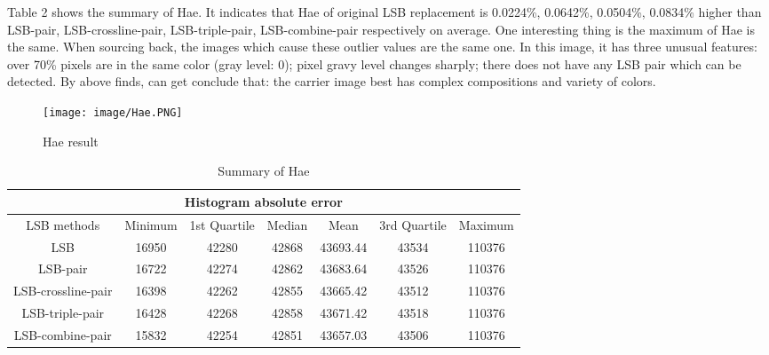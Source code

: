 \documentclass[%
    reprint,
    amsmath,amssymb,
    aps,
   ]{revtex4-1}
\begin{document}
   Table 2 shows the summary of Hae. It indicates that Hae of original LSB replacement is 0.0224\%, 0.0642\%, 0.0504\%, 0.0834\% higher than LSB-pair, LSB-crossline-pair, LSB-triple-pair, LSB-combine-pair respectively on average. One interesting thing is the maximum of Hae is the same. When sourcing back, the images which cause these outlier values are the same one. In this image, it has three unusual features: over 70\% pixels are in the same color (gray level: 0); pixel gravy level changes sharply; there does not have any LSB pair which can be detected. By above finds, can get conclude that: the carrier image best has complex compositions and variety of colors.   
   
   \begin{figure}[h]
   \texttt{[image: image/Hae.PNG]}
   \caption{Hae result}
   \label{fig:figure}
   \end{figure} 
   
   
   \begin{table*}
   \begin{tabular}{ |c|c|c|c|c|c|c|  }
    \hline
    \multicolumn{7}{|c|}{Histogram absolute error} \\
    \hline
    LSB methods    &Minimum&1st Quartile	&Median	&Mean	&3rd Quartile	&Maximum\\
    \hline
    LSB&               16950	&42280	&42868	&43693.44	&43534	&110376\\
    \hline
    LSB-pair	        &16722	&42274	&42862	&43683.64	&43526	&110376\\
    \hline
    LSB-crossline-pair	&16398	&42262	&42855	&43665.42	&43512	&110376\\
    \hline
    LSB-triple-pair	&16428	&42268	&42858	&43671.42	&43518	&110376\\
    \hline
    LSB-combine-pair	&15832	&42254	&42851	&43657.03	&43506	&110376\\
    \hline
   \end{tabular}
    \caption{Summary of Hae}
   \end{table*}
   
\end{document}
